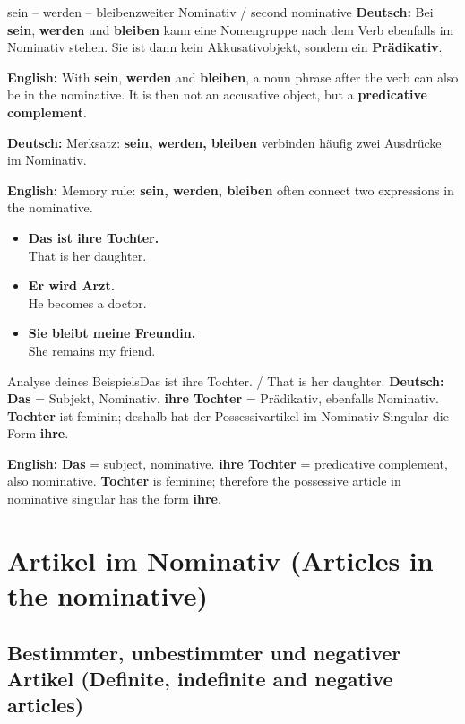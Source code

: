 \documentclass[a4paper,11pt]{article}
\newcommand{\GermanText}[1]{\textbf{Deutsch: }#1\par}
\newcommand{\EnglishText}[1]{{\small\color{SoftGray}\textbf{English: }#1\par}}
\newcommand{\ExampleItem}[2]{\item \textbf{#1}\\{\small\color{SoftGray}#2}}
\begin{document}
\begin{grammarentry}{sein -- werden -- bleiben}{zweiter Nominativ / second nominative}
\GermanText{Bei \textbf{sein}, \textbf{werden} und \textbf{bleiben} kann eine Nomengruppe nach dem Verb ebenfalls im Nominativ stehen. Sie ist dann kein Akkusativobjekt, sondern ein \textbf{Prädikativ}.}
\EnglishText{With \textbf{sein}, \textbf{werden} and \textbf{bleiben}, a noun phrase after the verb can also be in the nominative. It is then not an accusative object, but a \textbf{predicative complement}.}

\GermanText{Merksatz: \textbf{sein, werden, bleiben} verbinden häufig zwei Ausdrücke im Nominativ.}
\EnglishText{Memory rule: \textbf{sein, werden, bleiben} often connect two expressions in the nominative.}
\end{grammarentry}

\begin{exbox}
\begin{itemize}
\ExampleItem{Das ist ihre Tochter.}{That is her daughter.}
\ExampleItem{Er wird Arzt.}{He becomes a doctor.}
\ExampleItem{Sie bleibt meine Freundin.}{She remains my friend.}
\end{itemize}
\end{exbox}

\begin{grammarentry}{Analyse deines Beispiels}{Das ist ihre Tochter. / That is her daughter.}
\GermanText{\textbf{Das} = Subjekt, Nominativ. \textbf{ihre Tochter} = Prädikativ, ebenfalls Nominativ. \textbf{Tochter} ist feminin; deshalb hat der Possessivartikel im Nominativ Singular die Form \textbf{ihre}.}
\EnglishText{\textbf{Das} = subject, nominative. \textbf{ihre Tochter} = predicative complement, also nominative. \textbf{Tochter} is feminine; therefore the possessive article in nominative singular has the form \textbf{ihre}.}
\end{grammarentry}

\section{Artikel im Nominativ \textnormal{(Articles in the nominative)}}

\subsection{Bestimmter, unbestimmter und negativer Artikel \textnormal{(Definite, indefinite and negative articles)}}
\end{document}
